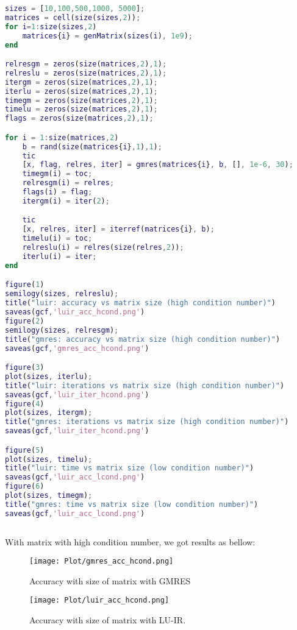 \begin{lstlisting}[language=Matlab,caption=Matrix with high contional number]
sizes = [10,100,500,1000, 5000];
matrices = cell(size(sizes,2));
for i=1:size(sizes,2)
    matrices{i} = genMatrix(sizes(i), 1e9);
end

relresgm = zeros(size(matrices,2),1);
relreslu = zeros(size(matrices,2),1);
itergm = zeros(size(matrices,2),1);
iterlu = zeros(size(matrices,2),1);
timegm = zeros(size(matrices,2),1);
timelu = zeros(size(matrices,2),1);
flags = zeros(size(matrices,2),1);

for i = 1:size(matrices,2)
    b = rand(size(matrices{i},1),1);
    tic
    [x, flag, relres, iter] = gmres(matrices{i}, b, [], 1e-6, 30);
    timegm(i) = toc;
    relresgm(i) = relres;
    flags(i) = flag;
    itergm(i) = iter(2);

    tic
    [x, relres, iter] = iterref(matrices{i}, b);
    timelu(i) = toc;
    relreslu(i) = relres(size(relres,2));
    iterlu(i) = iter;
end

figure(1)
semilogy(sizes, relreslu);
title("luir: accuracy vs matrix size (high condition number)")
saveas(gcf,'luir_acc_hcond.png')
figure(2)
semilogy(sizes, relresgm);
title("gmres: accuracy vs matrix size (high condition number)")
saveas(gcf,'gmres_acc_hcond.png')

figure(3)
plot(sizes, iterlu);
title("luir: iterations vs matrix size (high condition number)")
saveas(gcf,'luir_iter_hcond.png')
figure(4)
plot(sizes, itergm);
title("gmres: iterations vs matrix size (high condition number)")
saveas(gcf,'luir_iter_hcond.png')

figure(5)
plot(sizes, timelu);
title("luir: time vs matrix size (low condition number)")
saveas(gcf,'luir_acc_lcond.png')
figure(6)
plot(sizes, timegm);
title("gmres: time vs matrix size (low condition number)")
saveas(gcf,'luir_acc_lcond.png')
   
\end{lstlisting}
With matrix with high condition number, we got results as bellow:
\begin{figure}[ht]
     \begin{minipage}[b]{0.5\linewidth}
        \centering
   \texttt{[image: Plot/gmres\_acc\_hcond.png]}
        \caption{Accuracy with size of matrix with GMRES}
        \label{fig:image13}
    \end{minipage}
    \hspace{0.5cm} 
    \begin{minipage}[b]{0.5\linewidth}
        \centering
        \texttt{[image: Plot/luir\_acc\_hcond.png]}
        \caption{Accuracy with size of matrix with LU-IR.}
        \label{fig:image14}
    \end{minipage}
\end{figure}

